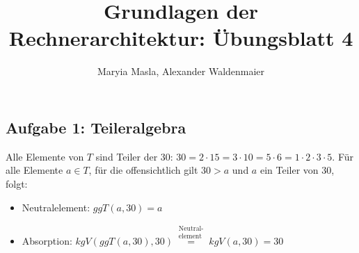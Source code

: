 \documentclass{article}
\title{Grundlagen der Rechnerarchitektur: Übungsblatt 4}
\author{Maryia Masla, Alexander Waldenmaier}
\begin{document}
    \maketitle

	\subsection*{Aufgabe 1: Teileralgebra}
	Alle Elemente von $T$ sind Teiler der 30: $30 = 2\cdot 15 = 3 \cdot 10 = 5 \cdot 6 = 1 \cdot 2 \cdot 3 \cdot 5$. Für alle Elemente $a \in T$, für die offensichtlich gilt $30>a$ und $a$ ein Teiler von 30, folgt: 
	\begin{itemize}
		\item Neutralelement: $ggT(a, 30) = a$
		\item Absorption: $kgV(ggT(a, 30), 30) \stackrel{\substack{\text{Neutral-} \\ \text{element}}}{=} kgV(a, 30) = 30$
	\end{itemize}
	
\end{document}
